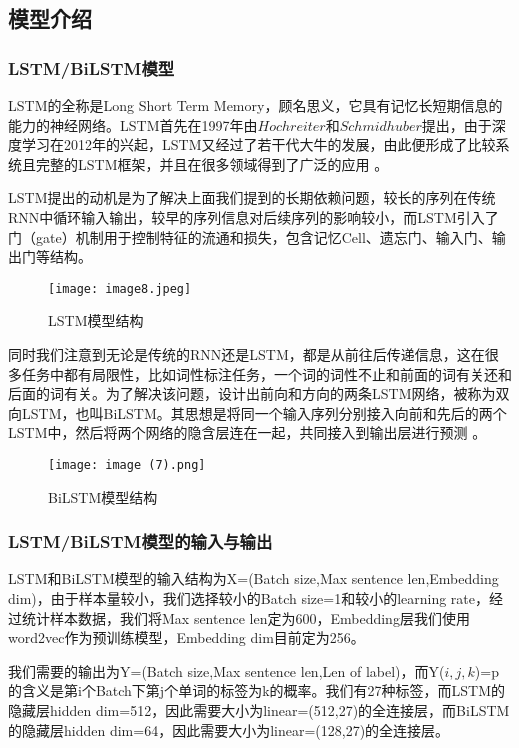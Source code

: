 \documentclass{article}
\begin{document}
\subsection{模型介绍}

\subsubsection{LSTM/BiLSTM模型}
LSTM的全称是Long Short Term Memory，顾名思义，它具有记忆长短期信息的能力的神经网络。LSTM首先在1997年由$Hochreiter$和$Schmidhuber$提出，由于深度学习在2012年的兴起，LSTM又经过了若干代大牛的发展，由此便形成了比较系统且完整的LSTM框架，并且在很多领域得到了广泛的应用\cite{schmidhuber2002learning} 。

LSTM提出的动机是为了解决上面我们提到的长期依赖问题，较长的序列在传统RNN中循环输入输出，较早的序列信息对后续序列的影响较小，而LSTM引入了门（gate）机制用于控制特征的流通和损失，包含记忆Cell、遗忘门、输入门、输出门等结构\cite{schmidhuber2002learning}。

\begin{figure}[H]
	\centering
    \texttt{[image: image8.jpeg]}
    \caption{LSTM模型结构}
    \label{fig:LSTM}
\end{figure}

同时我们注意到无论是传统的RNN还是LSTM，都是从前往后传递信息，这在很多任务中都有局限性，比如词性标注任务，一个词的词性不止和前面的词有关还和后面的词有关。为了解决该问题，设计出前向和方向的两条LSTM网络，被称为双向LSTM，也叫BiLSTM。其思想是将同一个输入序列分别接入向前和先后的两个LSTM中，然后将两个网络的隐含层连在一起，共同接入到输出层进行预测\cite{huang2015bidirectional} 。

\begin{figure}[H]
	\centering
    \texttt{[image: image (7).png]}
    \caption{BiLSTM模型结构}
    \label{fig:BiLSTM}
\end{figure}

\subsubsection{LSTM/BiLSTM模型的输入与输出}
LSTM和BiLSTM模型的输入结构为X=(Batch size,Max sentence len,Embedding dim)，由于样本量较小，我们选择较小的Batch size=1和较小的learning rate，经过统计样本数据，我们将Max sentence len定为600，Embedding层我们使用word2vec作为预训练模型，Embedding dim目前定为256。

我们需要的输出为Y=(Batch size,Max sentence len,Len of label)，而Y($i,j,k$)=p的含义是第i个Batch下第j个单词的标签为k的概率。我们有27种标签，而LSTM的隐藏层hidden dim=512，因此需要大小为linear=(512,27)的全连接层，而BiLSTM的隐藏层hidden dim=64，因此需要大小为linear=(128,27)的全连接层。
\end{document}
